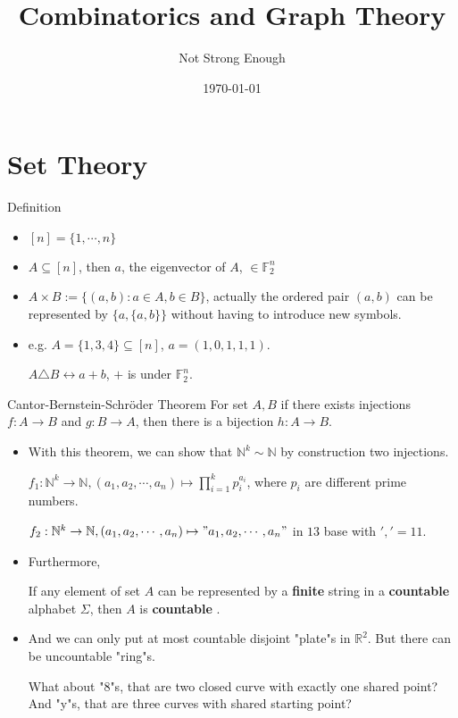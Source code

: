 \documentclass[UTF8, a4paper, linespread=1.5]{article}
\title{Combinatorics and Graph Theory}
\date{\today}
\author{Not Strong Enough}
\begin{document}
\maketitle

\section{Set Theory}

\begin{thm}{Definition}{}
    \begin{itemize}
        \item $[n] = \{1, \cdots , n\} $
        \item $A \subseteq [n]$, then $a$, the eigenvector of $A$, $\in \mathbb{F}_2^n$
        \item $A \times B := \{(a, b): a \in A, b \in B\} $, actually the ordered pair $(a, b)$ can be represented by $\{a, \{a, b\} \} $ without having to introduce new symbols.
    \end{itemize}
\end{thm}

\begin{itemize}
    \item 
        e.g. $A = \{1, 3, 4\} \subseteq [n]$, $a = (1, 0, 1, 1, 1)$.

        $A \triangle B \leftrightarrow a + b$, $+$ is under $\mathbb{F}_2^n$.
\end{itemize}

\begin{thm}{Cantor-Bernstein-Schröder Theorem}{}
    For set $A, B$ if there exists injections $f: A\to B$ and $g: B\to A$, then there is a bijection $h: A\to B$.
\end{thm}

\begin{itemize}
    \item 
        With this theorem, we can show that $\mathbb{N} ^k \sim  \mathbb{N} $ by construction two injections.

        $f_1: \mathbb{N} ^k \to \mathbb{N}, (a_1, a_2,\cdots ,a_n) \mapsto \prod_{i=1}^k p_i^{a_i} $, where $p_i$ are different prime numbers.

        $f_2: \mathbb{N} ^k \to  \mathbb{N} , (a_1, a_2, \cdots , a_n) \mapsto "a_1, a_2,\cdots ,a_n"$ in $13$ base with $',' = 11$.

    \item
        Furthermore, 
        \begin{thm}{}{}
            If any element of set $A$ can be represented by a \textbf{finite} string in a \textbf{countable} alphabet $\Sigma$, then $A$ is \textbf{countable} .
        \end{thm}

    \item
        And we can only put at most countable disjoint "plate"s in $\mathbb{R} ^2$. But there can be uncountable "ring"s.

        What about "8"s, that are two closed curve with exactly one shared point? And "y"s, that are three curves with shared starting point?
\end{itemize}
\end{document}
